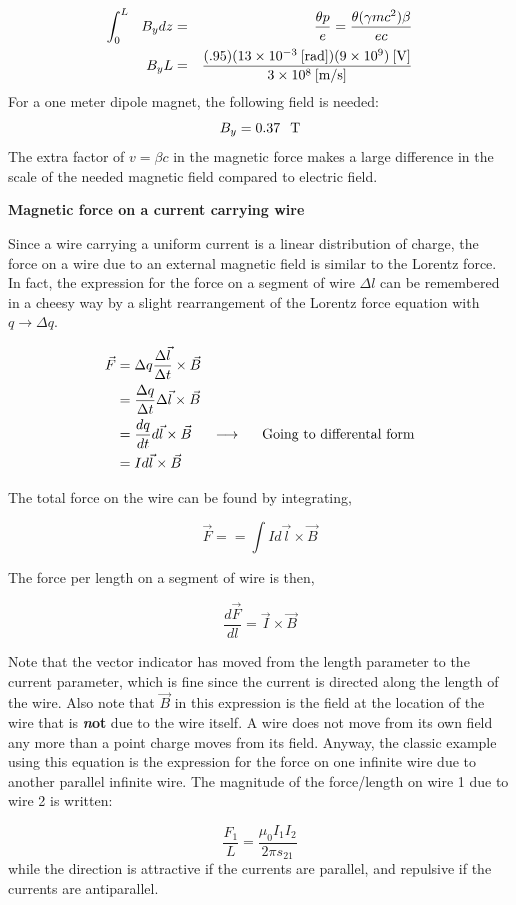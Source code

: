 \documentclass[12pt]{article}
\begin{document}
\begin{flushleft}
\begin{eqnarray*}
\int_{0}^{L}\hspace{.1in} B_{y} dz & = & \frac{\theta p}{e} = 
\frac{\theta (\gamma m c^{2}) \beta}{ec}\\
B_{y}L & = & \frac{(.95)(13 \times 10^{-3}\:\mbox{[rad]})(9 \times 10^{9}) \:\mbox{[V]}}
{3\times 10^{8} \:\mbox{[m/s]}}
\end{eqnarray*}
For a one meter dipole magnet, the following field is needed:
\[
B_{y} = 0.37 \hspace{.1in} \mbox{T}
\]
The extra factor of $v=\beta c$ in the magnetic force makes a large 
difference in the scale of the needed magnetic field compared to 
electric field.

{\bf \color{myblue} Magnetic force on a current carrying wire}

Since a wire carrying a uniform current is a linear distribution of charge, the force on a wire due to an external magnetic field is similar to the Lorentz force.  In fact, the expression for the force on a segment of wire $\Delta l$ can be remembered in a cheesy way by a slight rearrangement of the Lorentz force equation with $q\rightarrow \Delta q$.

\begin{eqnarray*}
\begin{aligned}
\vec{F} & = \Delta q \frac{\Delta \vec{l}}{\Delta t} \times \vec{B} \\
& = \frac{\Delta q}{\Delta t} \Delta \vec{l} \times \vec{B} \\
& = \frac{dq}{dt} d\vec{l} \times \vec{B} \hspace{.2in} \longrightarrow \hspace{.2in} \text{Going to differental form} \\
& = I d\vec{l} \times \vec{B} \\
\end{aligned}
\end{eqnarray*}

The total force on the wire can be found by integrating,

\[
\vec{F} = = \int I d\vec{l} \times \vec{B}
\]

The force per length on a segment of wire is then,

\[
\frac{d\vec{F}}{dl} = \vec{I} \times \vec{B}
\]

Note that the vector indicator has moved from the length parameter to the current parameter, which is fine since the current is directed along the length of the wire.  Also note that $\vec{B}$ in this expression is the field at the location of the wire that is {\textbf {\textit not}} due to the wire itself.  A wire does not move from its own field any more than a point charge moves from its field.  Anyway, the classic example using this equation is the expression for the force on one infinite wire due to another parallel infinite wire.  The magnitude of the force/length on wire 1 due to wire 2 is written:

\[
\frac{F_{1} }{L} = \frac{\mu_{0}I_{1}I_{2}}{2\pi s_{21}}
\]
while the direction is attractive if the currents are parallel, and repulsive if the currents are antiparallel.


\end{flushleft}
\end{document}
